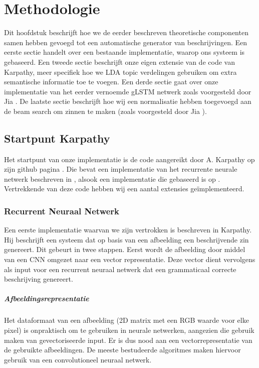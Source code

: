 \chapter{Methodologie}
Dit hoofdstuk beschrijft hoe we de eerder beschreven theoretische componenten samen hebben gevoegd tot een automatische generator van beschrijvingen. Een eerste sectie handelt over een bestaande implementatie, waarop ons systeem is gebaseerd. Een tweede sectie beschrijft onze eigen extensie van de code van Karpathy, meer specifiek hoe we LDA topic verdelingen gebruiken om extra semantische informatie toe te voegen. Een derde sectie gaat over onze implementatie van het eerder vernoemde gLSTM netwerk zoals voorgesteld door Jia . De laatste sectie beschrijft hoe wij een normalisatie hebben toegevoegd aan de beam search om zinnen te maken (zoals voorgesteld door Jia ).

\section{Startpunt Karpathy} 
Het startpunt van onze implementatie is de code aangereikt door A. Karpathy op zijn github pagina . Die bevat een implementatie van het recurrente neurale netwerk beschreven in , alsook een implementatie die gebaseerd is op . Vertrekkende van deze code hebben wij een aantal extensies ge\"implementeerd.
\subsection{Recurrent Neuraal Netwerk}
Een eerste implementatie waarvan we zijn vertrokken is beschreven in Karpathy. Hij beschrijft een systeem dat op basis van een afbeelding een beschrijvende zin genereert. Dit gebeurt in twee stappen. Eerst wordt de afbeelding door middel van een CNN omgezet naar een vector representatie. Deze vector dient vervolgens als input voor een recurrent neuraal netwerk dat een grammaticaal correcte beschrijving genereert.

\paragraph{Afbeeldingsrepresentatie}
Het dataformaat van een afbeelding (2D matrix met een RGB waarde voor elke pixel) is onpraktisch om te gebruiken in neurale netwerken, aangezien die gebruik maken van gevectoriseerde input. Er is dus nood aan een vectorrepresentatie van de gebruikte afbeeldingen. De meeste bestudeerde algoritmes maken hiervoor gebruik van een convolutioneel neuraal netwerk.

